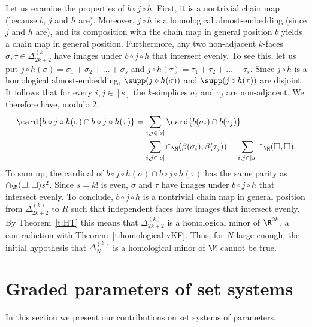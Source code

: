 %
\medskip
%
Let us examine the properties of $b\circ j \circ h$. First, it is a nontrivial chain map (because $b$, $j$ and $h$ are). Moreover, $j \circ h$ is a homological almost-embedding (since $j$ and $h$ are), and its composition with the chain map in general position $b$ yields a chain map in general position. Furthermore, any two non-adjacent $k$-faces $\sigma,\tau \in \Delta_{2k+2}^{(k)}$ have images under $b\circ j \circ h$ that intersect evenly. To see this, let us put $j \circ h(\sigma) = \sigma_1+\sigma_2+\ldots +\sigma_s$ and $j \circ h(\tau) = \tau_1+\tau_2+\ldots+\tau_s$. Since $j \circ h$ is a homological almost-embedding, $\supp(j \circ h(\sigma))$ and $\supp(j \circ h(\tau))$ are disjoint. It follows that for every $i,j \in [s]$ the $k$-simplices $\sigma_i$ and $\tau_j$ are non-adjacent. We therefore have, modulo 2, 
%
\[\begin{aligned}
\card{b\circ j \circ h(\sigma) \cap b\circ j \circ h(\tau)} &= \sum_{i,j \in [s]} \card{b(\sigma_i) \cap b(\tau_j)}\\
&= \sum_{i,j \in [s]} \cap_{\M}(\beta(\sigma_i),\beta(\tau_j)) = \sum_{i,j \in [s]} \cap_{\M}(\square,\square).
\end{aligned}  \]
%
\noindent
To sum up, the cardinal of $b\circ j \circ h(\sigma) \cap b\circ j \circ h(\tau)$ has the same parity as $\cap_{\M}(\square,\square)s^2$. Since $s=k!$ is even, $\sigma$ and $\tau$ have images under $b\circ j \circ h$ that intersect evenly.
%
\medskip
%
To conclude, $b\circ j \circ h$ is a nontrivial chain map in general position from $\Delta_{2k+2}^{(k)}$ to $R$ such that independent faces have images that intersect evenly. By Theorem~\ref{t:HT} this means that $\Delta_{2k+2}^{(k)}$ is a homological minor of $\R^{2k}$, a contradiction with Theorem~\ref{t:homological-vKF}. Thus, for $N$ large enough, the initial hypothesis that $\Delta_N^{(k)}$ is a homological minor of $\M$ cannot be true.
%
%
%
\section{Graded parameters of set systems}\label{s:graded}
%
In this section we present our contributions on set systems of parameters. %
%
%
